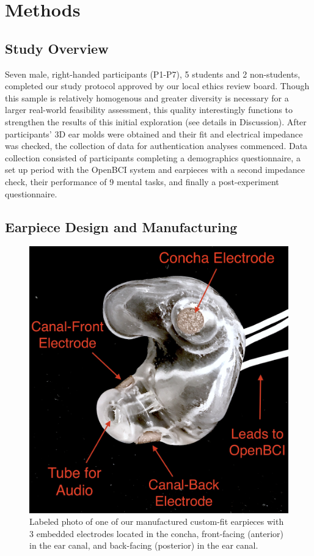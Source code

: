 \documentclass{sigchi}
\begin{document}
\section{Methods}

\subsection{Study Overview}

Seven male, right-handed participants (P1-P7), 5 students and 2 non-students, completed our study protocol approved by our local ethics review board. Though this sample is relatively homogenous and greater diversity is necessary for a larger real-world feasibility assessment, this quality interestingly functions to strengthen the results of this initial exploration (see details in Discussion). After participants' 3D ear molds were obtained and their fit and electrical impedance was checked, the collection of data for authentication analyses commenced. Data collection consisted of participants completing a demographics questionnaire, a set up period with the OpenBCI system and earpieces with a second impedance check, their performance of 9 mental tasks, and finally a post-experiment questionnaire.

\subsection{Earpiece Design and Manufacturing}

\begin{figure}[t]
\centering
\includegraphics[width=.75\linewidth]{./figures/CFEEEG_piecefig_Right.jpg}
\caption{Labeled photo of one of our manufactured custom-fit earpieces with 3 embedded electrodes located in the concha, front-facing (anterior) in the ear canal, and back-facing (posterior) in the ear canal.}
\label{fig:earpiece_diagram}
\end{figure}
\end{document}

